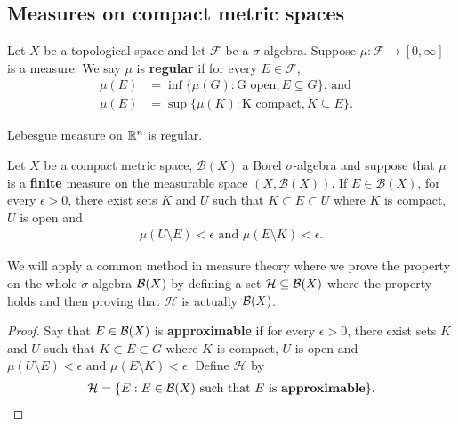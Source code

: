 \subsection{Measures on compact metric spaces}
\begin{definition}
Let $X$ be a topological space and let $\mathcal{F}$ be a $\sigma$-algebra. Suppose $\mu : \mathcal{F} \to [0, \infty]$ is a measure. We say $\mu$ is \textbf{regular} if for every $E \in \mathcal{F}$, 
\begin{align*}
    \mu(E) &= \inf \{ \mu(G) : \text{G open}, E \subseteq G \} \text{, and} &  \\
    \mu(E) &= \sup \{ \mu(K) : \text{K compact}, K \subseteq E \}.
\end{align*}
\begin{example}
Lebesgue measure on ${\mathbb R}^n$ is regular.
\end{example}
\begin{lemma}
\label{thm:fcs:approximation}
Let $X$ be a compact metric space, $\mathcal{B}(X)$ a Borel $\sigma$-algebra and suppose that $\mu$ is a \textbf{finite} measure on the measurable space $(X, \mathcal{B}(X))$. If $E \in \mathcal{B}(X)$, for every $\epsilon > 0$, there exist sets $K$ and $U$ such that $K \subset E \subset U$ where $K$ is compact, $U$ is open and 
\begin{align*}
    \mu (U \setminus E) < \epsilon \text{ and } \mu (E \setminus K) < \epsilon.
\end{align*}
\end{lemma}
\begin{proof-idea*}
We will apply a common method in measure theory where we prove the property on the whole $\sigma$-algebra ${\mathcal B}(X)$ by defining a set $\mathcal{H} \subseteq {\mathcal B}(X)$  where the property holds and then proving that $\mathcal{H}$ is actually ${\mathcal B}(X)$.
\end{proof-idea*}
\begin{proof}
    Say that $E \in {\mathcal B}(X)$ is \textbf{approximable} if for every $\epsilon > 0$, there exist sets $K$ and $U$ such that $K \subset E \subset G$ where $K$ is compact, $U$ is open and $\mu (U \setminus E) < \epsilon \text{ and } \mu (E \setminus K) < \epsilon.$
    Define $\mathcal{H}$ by \begin{align*}
        \mathcal{H} = \{ E : E \in {\mathcal B}(X) \text{ such that $E$ is \textbf{approximable}} \}.
    \end{align*}
    

\end{proof}
\end{definition}
